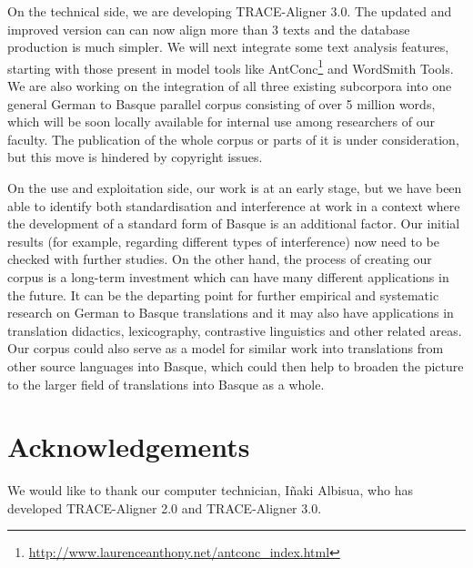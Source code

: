 \documentclass[output=paper]{LSP/langsci}
\begin{document}
On the technical side, we are developing TRACE-Aligner 3.0. The updated and improved version can can now align more than 3 texts and the database production is much simpler. We will next integrate some text analysis features, starting with those present in model tools like AntConc\footnote{\url{http://www.laurenceanthony.net/antconc_index.html}} and WordSmith Tools. We are also working on the integration of all three existing subcorpora into one general German to Basque parallel corpus consisting of over 5 million words, which will be soon locally available for internal use among researchers of our faculty. The publication of the whole corpus or parts of it is under consideration, but this move is hindered by copyright issues.

On the use and exploitation side, our work is at an early stage, but we have been able to identify both standardisation and interference at work in a context where the development of a standard form of Basque is an additional factor. Our initial results (for example, regarding different types of interference) now need to be checked with further studies. On the other hand, the process of creating our corpus is a long-term investment which can have many different applications in the future. It can be the departing point for further empirical and systematic research on German to Basque translations and it may also have applications in translation didactics, lexicography, contrastive linguistics and other related areas. Our corpus could also serve as a model for similar work into translations from other source languages into Basque, which could then help to broaden the picture to the larger field of translations into Basque as a whole.

\section{Acknowledgements}

We would like to thank our computer technician, Iñaki Albisua, who has developed TRACE-Aligner 2.0 and TRACE-Aligner 3.0.
\printbibliography[heading=subbibliography,notkeyword=this]
\end{document}
